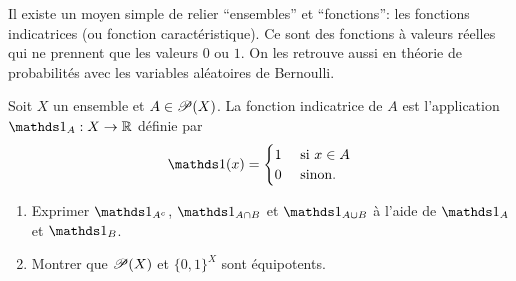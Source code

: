 \begin{remark}
    Il existe un moyen simple de relier ``ensembles'' et ``fonctions'': les fonctions indicatrices (ou fonction caractéristique). Ce sont des fonctions à valeurs réelles qui ne prennent que les valeurs \(0\) ou \(1\). On les retrouve aussi en théorie de probabilités avec les variables aléatoires de Bernoulli.
\end{remark}
\begin{td-exo}
    Soit \(X\) un ensemble et \(A\in\mathscr{P}(X)\). La fonction indicatrice de \(A\) est l'application \(\one_A:X\to\bb R\) définie par
    \[
    \one(x)=\begin{cases}
                        1 & \mbox{ si } x\in A \\
                        0 & \mbox{ sinon.}
    \end{cases}
    \]
    \begin{enumerate}
        \item Exprimer \(\one_{A^c}\), \(\one_{A\cap B}\) et \(\one_{A\cup B}\) à l'aide de \(\one_A\) et \(\one_B\).
        
        \item Montrer que \(\mathscr{P}(X)\) et \({\{0,1\}}^X\) sont équipotents.
    \end{enumerate}
\end{td-exo}
